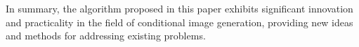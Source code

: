 \begin{abstract*}
In summary, the algorithm proposed in this paper exhibits significant innovation and practicality in the field of conditional image generation, providing new ideas and methods for addressing existing problems.

\end{abstract*}
